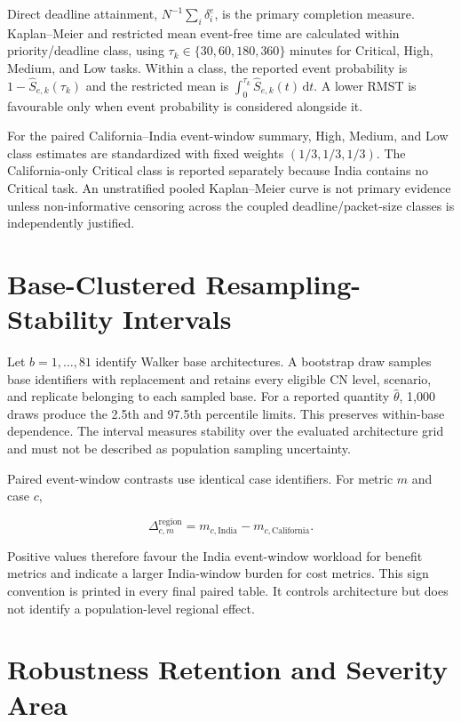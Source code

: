 Direct deadline attainment, $N^{-1}\sum_i\delta_i^e$, is the primary completion measure. Kaplan--Meier and restricted mean event-free time are calculated within priority/deadline class, using $\tau_k\in\{30,60,180,360\}$ minutes for Critical, High, Medium, and Low tasks. Within a class, the reported event probability is $1-\widehat S_{e,k}(\tau_k)$ and the restricted mean is $\int_0^{\tau_k}\widehat S_{e,k}(t)\,\mathrm{d}t$. A lower RMST is favourable only when event probability is considered alongside it.

For the paired California--India event-window summary, High, Medium, and Low class estimates are standardized with fixed weights $(1/3,1/3,1/3)$. The California-only Critical class is reported separately because India contains no Critical task. An unstratified pooled Kaplan--Meier curve is not primary evidence unless non-informative censoring across the coupled deadline/packet-size classes is independently justified.

\section{Base-Clustered Resampling-Stability Intervals}

Let $b=1,\ldots,81$ identify Walker base architectures. A bootstrap draw samples base identifiers with replacement and retains every eligible CN level, scenario, and replicate belonging to each sampled base. For a reported quantity $\widehat\theta$, 1,000 draws produce the 2.5th and 97.5th percentile limits. This preserves within-base dependence. The interval measures stability over the evaluated architecture grid and must not be described as population sampling uncertainty.

Paired event-window contrasts use identical case identifiers. For metric $m$ and case $c$,

\begin{equation}
\Delta^{\mathrm{region}}_{c,m}=m_{c,\mathrm{India}}-m_{c,\mathrm{California}}.
\end{equation}

Positive values therefore favour the India event-window workload for benefit metrics and indicate a larger India-window burden for cost metrics. This sign convention is printed in every final paired table. It controls architecture but does not identify a population-level regional effect.

\section{Robustness Retention and Severity Area}

